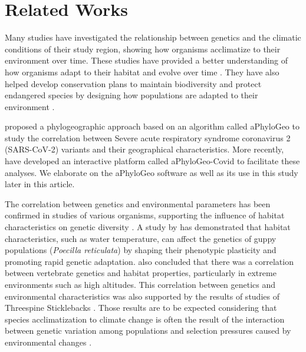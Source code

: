 \section{Related Works}\label{related-works}
Many studies have investigated the relationship between genetics and the climatic conditions of their study region, showing how organisms acclimatize to their environment over time. These studies have provided a better understanding of how organisms adapt to their habitat and evolve over time \citep{fc_genomic_2012}. They have also helped develop conservation plans to maintain biodiversity and protect endangered species by designing how populations are adapted to their environment \citep{balkenhol_identifying_2009}.

\cite{koshkarov_phylogeography_2022} proposed a phylogeographic approach based on an algorithm called aPhyloGeo to study the correlation between Severe acute respiratory syndrome coronavirus 2 (SARS-CoV-2) variants and their geographical characteristics. More recently, \cite{li_aphylogeo-covid_2023} have developed an interactive platform called aPhyloGeo-Covid to facilitate these analyses.  We elaborate on the aPhyloGeo software as well as its use in this study later in this article.

The correlation between genetics and environmental parameters has been confirmed in studies of various organisms, supporting the influence of habitat characteristics on genetic diversity \citep{colosimo_widespread_2005,cheviron_genomic_2012}. A study by \citep{ghalambor_adaptive_2007} has demonstrated that habitat characteristics, such as water temperature, can affect the genetics of guppy populations (\emph{Poecilla reticulata}) by shaping their phenotypic plasticity and promoting rapid genetic adaptation. \cite{cheviron_genomic_2012} also concluded that there was a correlation between vertebrate genetics and habitat properties, particularly in extreme environments such as high altitudes. This correlation between genetics and environmental characteristics was also supported by the results of studies of Threespine Sticklebacks \citep{colosimo_widespread_2005}. Those results are to be expected considering that species acclimatization to climate change is often the result of the interaction between genetic variation among populations and selection pressures caused by environmental changes \citep{hoffmann_climate_2011}.

